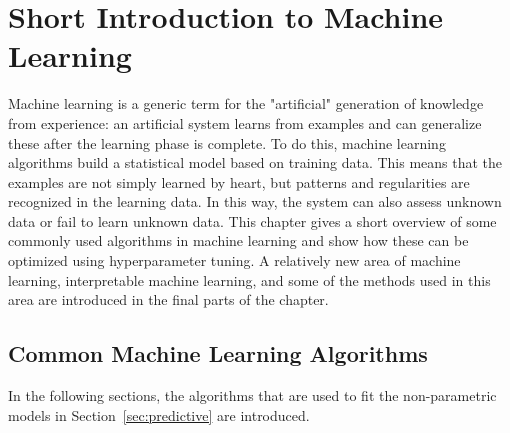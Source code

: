 %
\chapter{Short Introduction to Machine Learning}\label{ch:ml}
Machine learning is a generic term for the "artificial" generation of knowledge from experience: an artificial system learns from examples and can generalize these after the learning phase is complete. To do this, machine learning algorithms build a statistical model based on training data. This means that the examples are not simply learned by heart, but patterns and regularities are recognized in the learning data. In this way, the system can also assess unknown data or fail to learn unknown data. This chapter gives a short overview of some commonly used algorithms in machine learning and show how these can be optimized using hyperparameter tuning. A relatively new area of machine learning, interpretable machine learning, and some of the methods used in this area are introduced in the final parts of the chapter.
\section{Common Machine Learning Algorithms}\label{sec:algo}
In the following sections, the algorithms that are used to fit the non-parametric models in Section~\ref{sec:predictive} are introduced.
